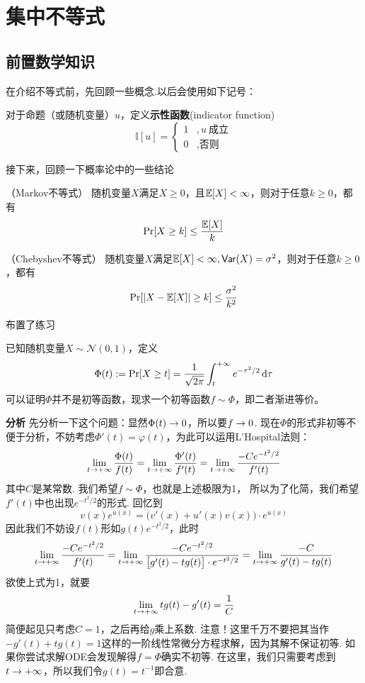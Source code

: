 \chapter{集中不等式}

\section{前置数学知识}

在介绍不等式前，先回顾一些概念.以后会使用如下记号：
\begin{definition}
    对于命题（或随机变量）$u$，定义\textbf{示性函数}(indicator function)
    \[
    \mathbb{I}[u] = \begin{cases}
        1 &, u \ \text{成立} \\
        0 &, \text{否则}
    \end{cases}
    \]
\end{definition}

接下来，回顾一下概率论中的一些结论
\begin{theorem}（Markov不等式）
    随机变量$X$满足$X\ge 0$，且$\E[X] < \infty$，则对于任意$k \ge 0$，都有 
    \[
    \Pr[X \ge k] \le \dfrac{\E[X]}{k}
    \]
\end{theorem}
\begin{theorem}（Chebyshev不等式）
    随机变量$X$满足$\E[X] < \infty, \var(X) = \sigma^2$，则对于任意$k \ge 0$，都有 
    \[
    \Pr[\abs{X - \E[X]} \ge k] \le \dfrac{\sigma^2}{k^2}
    \]
\end{theorem}

布置了练习
\begin{exercise} \label{exr:taildistrib}
已知随机变量$X \sim \mathcal{N}(0, 1)$，定义 
\[
\Phi(t) := \Pr[X \ge t] = \dfrac{1}{\sqrt{2\pi}}\int_{t}^{+\infty} e^{-\tau^2/2} \dx[\tau]
\]
可以证明$\Phi$并不是初等函数，现求一个初等函数$f \sim \Phi$，即二者渐进等价。
\end{exercise}

\textbf{分析} \quad 先分析一下这个问题：显然$\Phi(t) \ra 0$，所以要$f \ra 0$. 现在$\Phi$的形式非初等不便于分析，不妨考虑$\Phi'(t) = \varphi(t)$，为此可以运用L'Hospital法则：
\[
\lim_{t \ra +\infty} \dfrac{\Phi(t)}{f(t)} = \lim_{t \ra +\infty} \dfrac{\Phi'(t)}{f'(t)} = \lim_{t \ra +\infty} \dfrac{-C e^{-t^2/2}}{f'(t)}
\]
其中$C$是某常数. 我们希望$f \sim \Phi$，也就是上述极限为1， 所以为了化简，我们希望$f'(t)$中也出现$e^{-t^2/2}$的形式. 回忆到 
\[
v(x)e^{u(x)} = \Big(v'(x) + u'(x)v(x) \Big) \cdot e^{u(x)}
\]
因此我们不妨设$f(t)$形如$g(t) e^{-t^2/2}$，此时
\[
\lim_{t \ra +\infty} \dfrac{-C e^{-t^2/2}}{f'(t)}
= \lim_{t \ra +\infty} \dfrac{-C e^{-t^2/2}}{\big[g'(t) - tg(t)\big] \cdot e^{-t^2/2}} = \lim_{t \ra +\infty}\dfrac{-C}{g'(t) - tg(t)}
\]
欲使上式为1，就要
\[
\lim_{t\ra +\infty}  tg(t) - g'(t) = \dfrac{1}{C}
\]
简便起见只考虑$C=1$，之后再给$g$乘上系数. 注意！这里千万不要把其当作$-g'(t) + tg(t) = 1$这样的一阶线性常微分方程求解，因为其解不保证初等. 如果你尝试求解ODE会发现解得$f = \Phi$确实不初等. 在这里，我们只需要考虑到$t \ra +\infty$，所以我们令$g(t) = t^{-1}$即合意.

